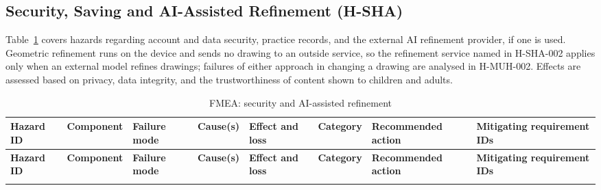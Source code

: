 \documentclass{article}
\newenvironment{fmealandscape}{
    \begin{landscape}
    \pagestyle{empty}
    \AddToShipoutPictureFG{ \AtPageLowerLeft{
        \put(\LenToUnit{\dimexpr\paperwidth-1.5cm\relax},
        \LenToUnit{.5\paperheight}){ \makebox(0,0)[c]{\rotatebox{90}{\thepage}}
        } } } }{
    \end{landscape}
    \ClearShipoutPictureFG }
\begin{document}
\subsection{Security, Saving and AI-Assisted Refinement (H-SHA)}
\label{sec:fmea-sha}

Table~\ref{tab:fmea-sha} covers hazards regarding account and data security,
practice records, and the external AI refinement provider, if one is used.
Geometric refinement runs on the device and sends no drawing to an outside
service, so the refinement service named in H-SHA-002 applies only when an
external model refines drawings; failures of either approach in changing a
drawing are analysed in H-MUH-002. Effects are assessed based on privacy, data
integrity, and the trustworthiness of content shown to children and adults.

\begin{fmealandscape}
{\footnotesize
\setlength{\tabcolsep}{3pt}
\begin{longtable}{@{}
  >{\raggedright\arraybackslash}p{1.4cm} >{\raggedright\arraybackslash}p{1.8cm}
  >{\raggedright\arraybackslash}p{2.4cm} >{\raggedright\arraybackslash}p{2.3cm}
  >{\raggedright\arraybackslash}p{2.6cm} >{\raggedright\arraybackslash}p{1.9cm}
  >{\raggedright\arraybackslash}p{3.4cm}
  >{\raggedright\arraybackslash}p{2.0cm}@{}}
\caption{FMEA: security and AI-assisted refinement}
\label{tab:fmea-sha}\\
\toprule
\textbf{Hazard ID} & \textbf{Component} & \textbf{Failure mode} &
\textbf{Cause(s)} & \textbf{Effect and loss} & \textbf{Category} &
\textbf{Recommended action} & \textbf{Mitigating requirement IDs} \\
\midrule
\endfirsthead
\toprule
\textbf{Hazard ID} & \textbf{Component} & \textbf{Failure mode} &
\textbf{Cause(s)} & \textbf{Effect and loss} & \textbf{Category} &
\textbf{Recommended action} & \textbf{Mitigating requirement IDs} \\
\midrule
\endhead
\bottomrule
\endlastfoot


\end{longtable}}
\end{fmealandscape}
\end{document}
